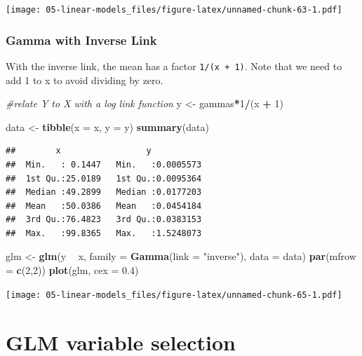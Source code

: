 \documentclass[openany]{book}
\newenvironment{Shaded}{\begin{snugshade}}{\end{snugshade}}
\newcommand{\CommentTok}[1]{\textcolor[rgb]{0.56,0.35,0.01}{\textit{#1}}}
\newcommand{\DataTypeTok}[1]{\textcolor[rgb]{0.13,0.29,0.53}{#1}}
\newcommand{\DecValTok}[1]{\textcolor[rgb]{0.00,0.00,0.81}{#1}}
\newcommand{\FloatTok}[1]{\textcolor[rgb]{0.00,0.00,0.81}{#1}}
\newcommand{\KeywordTok}[1]{\textcolor[rgb]{0.13,0.29,0.53}{\textbf{#1}}}
\newcommand{\NormalTok}[1]{#1}
\newcommand{\OperatorTok}[1]{\textcolor[rgb]{0.81,0.36,0.00}{\textbf{#1}}}
\newcommand{\StringTok}[1]{\textcolor[rgb]{0.31,0.60,0.02}{#1}}
\begin{document}
\texttt{[image: 05-linear-models\_files/figure-latex/unnamed-chunk-63-1.pdf]}

\hypertarget{gamma-with-inverse-link}{%
\subsection{Gamma with Inverse Link}\label{gamma-with-inverse-link}}

With the inverse link, the mean has a factor \texttt{1/(x\ +\ 1)}. Note that we need to add 1 to x to avoid dividing by zero.

\begin{Shaded}
\begin{Highlighting}[]
\CommentTok{#relate Y to X with a log link function}
\NormalTok{y <-}\StringTok{ }\NormalTok{gammas}\OperatorTok{*}\DecValTok{1}\OperatorTok{/}\NormalTok{(x }\OperatorTok{+}\StringTok{ }\DecValTok{1}\NormalTok{)}

\NormalTok{data <-}\StringTok{ }\KeywordTok{tibble}\NormalTok{(}\DataTypeTok{x =}\NormalTok{ x, }\DataTypeTok{y  =}\NormalTok{ y)}
\KeywordTok{summary}\NormalTok{(data)}
\end{Highlighting}
\end{Shaded}

\begin{verbatim}
##        x                 y            
##  Min.   : 0.1447   Min.   :0.0005573  
##  1st Qu.:25.0189   1st Qu.:0.0095364  
##  Median :49.2899   Median :0.0177203  
##  Mean   :50.0386   Mean   :0.0454184  
##  3rd Qu.:76.4823   3rd Qu.:0.0383153  
##  Max.   :99.8365   Max.   :1.5248073
\end{verbatim}

\begin{Shaded}
\begin{Highlighting}[]
\NormalTok{glm <-}\StringTok{ }\KeywordTok{glm}\NormalTok{(y }\OperatorTok{~}\StringTok{ }\NormalTok{x, }\DataTypeTok{family =} \KeywordTok{Gamma}\NormalTok{(}\DataTypeTok{link =} \StringTok{"inverse"}\NormalTok{), }\DataTypeTok{data =}\NormalTok{ data)}
\KeywordTok{par}\NormalTok{(}\DataTypeTok{mfrow =} \KeywordTok{c}\NormalTok{(}\DecValTok{2}\NormalTok{,}\DecValTok{2}\NormalTok{))}
\KeywordTok{plot}\NormalTok{(glm, }\DataTypeTok{cex =} \FloatTok{0.4}\NormalTok{)}
\end{Highlighting}
\end{Shaded}

\texttt{[image: 05-linear-models\_files/figure-latex/unnamed-chunk-65-1.pdf]}

\hypertarget{glm-variable-selection}{%
\chapter{GLM variable selection}\label{glm-variable-selection}}
\end{document}
